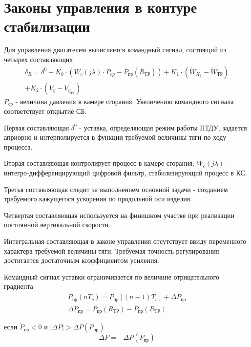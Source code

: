 \section{Законы управления в контуре стабилизации}
Для управления двигателем вычисляется командный сигнал, состоящий из четырех составляющих 
\begin{equation}
	\begin{gathered}
		\delta_R = \delta^0 + K_0 \cdot \left( W_c (j \lambda) \cdot P_{cp} - \overline{P}_\text{пр} (\overline{R}_\text{ТР}) \right) + K_1 \cdot \left( \dot{W}_{X_1} - \dot{W}_\text{ТР} \right) \\ + K_2 \cdot \left( V_{\eta} - V_{\eta_\text{ТР}} \right) 
	\end{gathered}
\end{equation}
$P_{\text{ср}}$ - величина давления в камере сгорания. Увеличению командного сигнала соответствует открытие СБ.

Первая составляющая $\delta^0$ - уставка, определяющая режим работы ПТДУ, задается априорно и интерполируется в функции требуемой величины тяги по ходу процесса.

Вторая составляющая контролирует процесс в камере сгорания; $W_c (j \lambda)$ - интегро-дифференцирующий цифровой фильтр, стабилизирующий процесс в КС.

Третья составляющая следит за выполнением основной задачи - созданием требуемого кажущегося ускорения по продольной оси изделия.

Четвертая составляющая используется на финишном участке при реализации постоянной вертикальной скорости.

Интегральная составляющая в законе управления отсутствует ввиду переменного характера требуемой величины тяги. Требуемая точность регулирования достигается достаточным коэффициентом усиления.

Командный сигнал уставки ограничивается по величине отрицательного градиента
\begin{equation}
	\begin{gathered}
		\overline{P}_\text{пр} (nT_c) = \overline{P}_\text{пр} \left[ (n-1)T_c \right] + \Delta P_\text{пр} \\
		\Delta P_\text{пр} = P_\text{пр} (R_\text{ТР}) - \overline{P}_\text{пр} (R_\text{ТР})
	\end{gathered}
\end{equation}

если $\dot{P}_\text{пр}<0$ и $|\Delta P| > \Delta P(P_\text{пр})$
\begin{equation}
	\Delta P = - \Delta P (P_\text{пр})
\end{equation}

